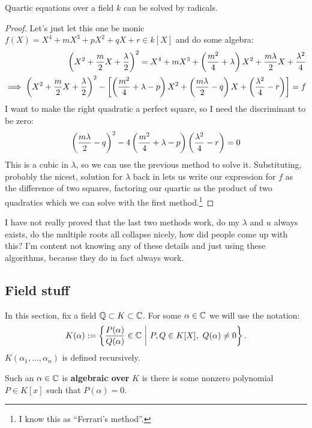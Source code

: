 \documentclass{article}
\begin{document}
\begin{proposition}
    Quartic equations over a field $k$ can be solved by radicals.
    \begin{proof}
        Let's just let this one be monic $f(X) = X^4+mX^3 + pX^2 + qX + r \in k[X]$ and do some algebra: \begin{align*}
            \left( X^2+\frac{m}{2}X + \frac{\lambda}{2} \right)^2 = X^4 + mX^3 + \left( \frac{m^2}{4} + \lambda \right)X^2 + \frac{m\lambda}{2}X + \frac{\lambda^2}{4}\\
            \implies \left( X^2+\frac{m}{2}X + \frac{\lambda}{2} \right)^2 - \left[ \left( \frac{m^2}{4}+\lambda - p \right)X^2 + \left( \frac{m\lambda}{2}-q \right)X + \left( \frac{\lambda^2}{4} - r \right) \right] = f
        \end{align*}
        I want to make the right quadratic a perfect square, so I need the discriminant to be zero: \[
        \left( \frac{m\lambda}{2}-q \right)^2 - 4\left( \frac{m^2}{4}+\lambda - p \right)\left( \frac{\lambda^2}{4} - r \right) = 0
        \] This is a cubic in $\lambda$, so we can use the previous method to solve it. Substituting, probably the nicest, solution for $\lambda$ back in lets us write our expression for $f$ as the difference of two squares, factoring our quartic as the product of two quadratics which we can solve with the first method.\footnote{I know this as ``Ferrari's method''.}
    \end{proof}
\end{proposition}

I have not really proved that the last two methods work, do my $\lambda$ and $u$ always exists, do the multiple roots all collapse nicely, how did people come up with this? I'm content not knowing any of these details and just using these algorithms, because they do in fact always work.

\subsection{Field stuff}

In this section, fix a field $\mathbb{Q}\subset K \subset \mathbb{C}$. For some $\alpha\in \mathbb{C}$ we will use the notation: \[
K(\alpha) := \left\{
    \frac{P(\alpha)}{Q(\alpha)} \in \bC \ \middle| \ P,Q\in K[X], \ Q(\alpha)\neq 0
\right\}.
\]
$K(\alpha_1,\ldots,\alpha_n)$ is defined recursively.

\begin{definition}
    Such an $\alpha\in \mathbb{C}$ is \textbf{algebraic over} $K$ is there is some nonzero polynomial $P\in K[x]$ such that $P(\alpha) = 0$.
\end{definition}
\end{document}
